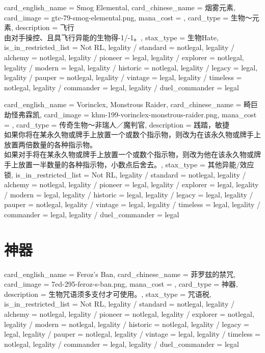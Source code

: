 \documentclass[lang = cn, color = black, 10pt]{AllThatStax}
\begin{document}
\card
{
	card_english_name = {Smog Elemental},
	card_chinese_name = {烟雾元素},
	card_image = gtc-79-smog-elemental.png,
	mana_cost = ,
	card_type = 生物～元素,
	description = {飞行\\
由对手操控、且具飞行异能的生物得-1/-1。},
	stax_type = 生物Hate,
	is_in_restricted_list = Not RL,
	legality / standard = notlegal,
	legality / alchemy = notlegal,
	legality / pioneer = legal,
	legality / explorer = notlegal,
	legality / modern = legal,
	legality / historic = notlegal,
	legality / legacy = legal,
	legality / pauper = notlegal,
	legality / vintage = legal,
	legality / timeless = notlegal,
	legality / commander = legal,
	legality / duel_commander = legal
}

\card
{
	card_english_name = {Vorinclex, Monstrous Raider},
	card_chinese_name = {畸巨劫怪弗霖凯},
	card_image = khm-199-vorinclex-monstrous-raider.png,
	mana_cost = ,
	card_type = 传奇生物～非瑞人／魔判官,
	description = {践踏，敏捷\\
如果你将在某永久物或牌手上放置一个或数个指示物，则改为在该永久物或牌手上放置两倍数量的各种指示物。\\
如果对手将在某永久物或牌手上放置一个或数个指示物，则改为他在该永久物或牌手上放置一半数量的各种指示物，小数点后舍去。},
	stax_type = 其他异能/效应锁,
	is_in_restricted_list = Not RL,
	legality / standard = notlegal,
	legality / alchemy = notlegal,
	legality / pioneer = legal,
	legality / explorer = legal,
	legality / modern = legal,
	legality / historic = legal,
	legality / legacy = legal,
	legality / pauper = notlegal,
	legality / vintage = legal,
	legality / timeless = legal,
	legality / commander = legal,
	legality / duel_commander = legal
}

\section{神器}

\card
{
	card_english_name = {Feroz's Ban},
	card_chinese_name = {菲罗玆的禁咒},
	card_image = 7ed-295-feroz-s-ban.png,
	mana_cost = ,
	card_type = 神器,
	description = {生物咒语须多支付才可使用。},
	stax_type = 咒语税,
	is_in_restricted_list = Not RL,
	legality / standard = notlegal,
	legality / alchemy = notlegal,
	legality / pioneer = notlegal,
	legality / explorer = notlegal,
	legality / modern = notlegal,
	legality / historic = notlegal,
	legality / legacy = legal,
	legality / pauper = notlegal,
	legality / vintage = legal,
	legality / timeless = notlegal,
	legality / commander = legal,
	legality / duel_commander = legal
}
\end{document}
